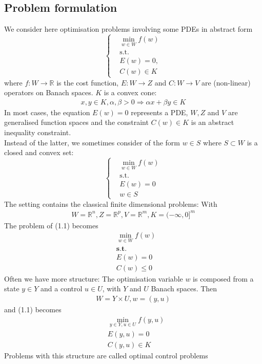 \subsection{Problem formulation}
We consider here optimisation problems involving some PDEs in abstract form 
\begin{equation}
\left\{
\begin{aligned}
	&\min_{w \in W} f(w)\\ 
	&\text{s.t.}\\
	&E(w) = 0, \\
	&C(w) \in K
\end{aligned}
\right.
\end{equation}
where $f: W \rightarrow \mathbb{R}$ is the cost function, $E: W\rightarrow Z$ and $C: W \rightarrow V$ are (non-linear) operators on Banach spaces. $K$ is a convex cone:
\begin{align*}
	x, y \in K, \alpha, \beta > 0 \Rightarrow \alpha x + \beta y \in K
\end{align*}
In most cases, the equation $E(w) = 0$ represents a PDE, $W, Z$ and $V$ are generalised function spaces and the constraint $C(w) \in K$ is an abstract inequality constraint. \\
Instead of the latter, we sometimes consider of the form $w \in S$ where $S \subset W$ is a closed and convex set:
\begin{equation*}
\left\{
\begin{aligned}
	&\min_{w \in W} f(w)\\
	&\text{s.t.}\\
	&E(w) = 0\\
	&w \in S
\end{aligned}
\right.
\end{equation*}
The setting contains the classical finite dimensional problems: With
\begin{align*}
	W = \mathbb{R}^n, Z = \mathbb{R}^p, V = \mathbb{R}^m, K = (-\infty, 0]^m
\end{align*}
The problem of (1.1) becomes 
\begin{align*}
	&\min_{w \in W} f(w) \\
	&\textbf{s.t.} \\
	&E(w) = 0\\
	&C(w) \le 0
\end{align*}
Often we have more structure: The optimisation variable $w$ is composed from a state $y \in Y$ and a control $u \in U$, with $Y$ and $U$ Banach spaces. Then
\begin{align*}
	W = Y \times U, w = (y, u)
\end{align*}
and (1.1) becomes
\begin{align*}
	&\min_{y \in Y, u \in U} f(y, u) \\
	&E(y, u) = 0\\
	&C(y, u) \in K
\end{align*}
Problems with this structure are called optimal control problems


